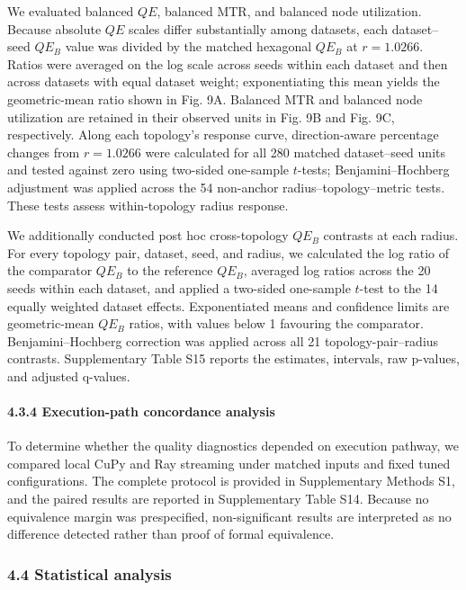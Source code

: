 \documentclass[
]{article}
\providecommand{\DIFadd}[1]{{\protect\color{blue} #1}} %
\providecommand{\DIFaddend}{} %
\begin{document}
\DIFadd{We evaluated balanced \(QE\), balanced MTR, and balanced node
utilization. Because absolute \(QE\) scales differ substantially among
datasets, each dataset--seed \(QE_B\) value was divided by the matched
hexagonal \(QE_B\) at \(r=1.0266\). Ratios were averaged on the log
scale across seeds within each dataset and then across datasets with
equal dataset weight; exponentiating this mean yields the geometric-mean
ratio shown in Fig. 9A. Balanced MTR and balanced node utilization are
retained in their observed units in Fig. 9B and Fig. 9C, respectively.
Along each topology's response curve, direction-aware percentage changes
from \(r=1.0266\) were calculated for all 280 matched dataset--seed
units and tested against zero using two-sided one-sample \(t\)-tests;
Benjamini--Hochberg adjustment was applied across the 54 non-anchor
radius--topology--metric tests. These tests assess within-topology
radius response.
}

\DIFadd{We additionally conducted post hoc cross-topology \(QE_B\) contrasts at
each radius. For every topology pair, dataset, seed, and radius, we
calculated the log ratio of the comparator \(QE_B\) to the reference
\(QE_B\), averaged log ratios across the 20 seeds within each dataset,
and applied a two-sided one-sample \(t\)-test to the 14 equally weighted
dataset effects. Exponentiated means and confidence limits are
geometric-mean \(QE_B\) ratios, with values below 1 favouring the
comparator. Benjamini--Hochberg correction was applied across all 21
topology-pair--radius contrasts. Supplementary Table S15 reports the
estimates, intervals, raw p-values, and adjusted q-values.
}

\paragraph{\DIFadd{4.3.4 Execution-path concordance
analysis}}\label{execution-path-concordance-analysis}

\DIFadd{To determine whether the quality diagnostics depended on execution
pathway, we compared local CuPy and Ray streaming under matched inputs
and fixed tuned configurations. The complete protocol is provided in
Supplementary Methods S1, and the paired results are reported in
Supplementary Table S14. Because no equivalence margin was prespecified,
non-significant results are interpreted as no difference detected rather
than proof of formal equivalence.
}

\DIFaddend \subsubsection{4.4 Statistical analysis}\label{statistical-analysis}
\end{document}

